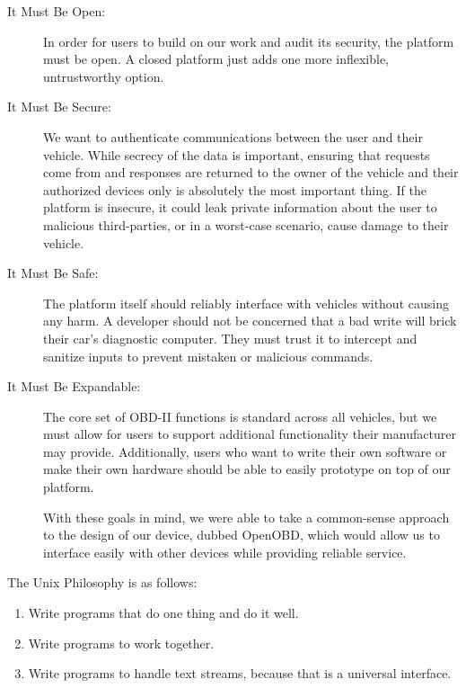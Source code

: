 \documentclass[10pt,letterpaper,unboxed,cm]{article}
\begin{document}
\begin{description}

\item [It Must Be Open:] In order for users to build on our work and audit its security, the platform must be open. A closed platform just adds one more inflexible, untrustworthy option.

\item [It Must Be Secure:] We want to authenticate communications between the user and their vehicle. While secrecy of the data is important, ensuring that requests come from and responses are returned to the owner of the vehicle and their authorized devices only is absolutely the most important thing. If the platform is insecure, it could leak private information about the user to malicious third-parties, or in a worst-case scenario, cause damage to their vehicle.

\item [It Must Be Safe:] The platform itself should reliably interface with vehicles without causing any harm. A developer should not be concerned that a bad write will brick their car's diagnostic computer. They must trust it to intercept and sanitize inputs to prevent mistaken or malicious commands.

\item [It Must Be Expandable:] The core set of OBD-II functions is standard across all vehicles, but we must allow for users to support additional functionality their manufacturer may provide. Additionally, users who want to write their own software or make their own hardware should be able to easily prototype on top of our platform.

With these goals in mind, we were able to take a common-sense approach to the design of our device, dubbed OpenOBD, which would allow us to interface easily with other devices while providing reliable service.

\end{description}

The Unix Philosophy is as follows:

\begin{enumerate}
  \item
  Write programs that do one thing and do it well.

  \item
  Write programs to work together.

  \item
  Write programs to handle text streams, because that is a universal interface.

\end{enumerate}
\end{document}
